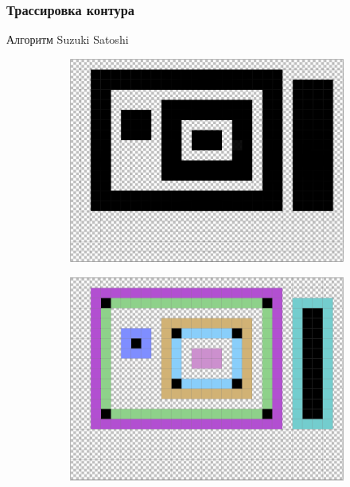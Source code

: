 \documentclass[10pt, unicode]{beamer}
\begin{document}
    \begin{frame}
        \frametitle{Трассировка контура}
        Алгоритм Suzuki Satoshi %
        \begin{figure}[H]
            \centering
            \begin{subfigure}[t]{.49\linewidth}
                \centering
                \includegraphics[scale=0.25]{SuzukiExample_upscaled.png}
            \end{subfigure}
            \begin{subfigure}[t]{.49\linewidth}
                \centering
                \includegraphics[scale=0.25]{SuzukiExample_contours_upscaled.png}
            \end{subfigure}
        \end{figure}
    \end{frame}
\end{document}
